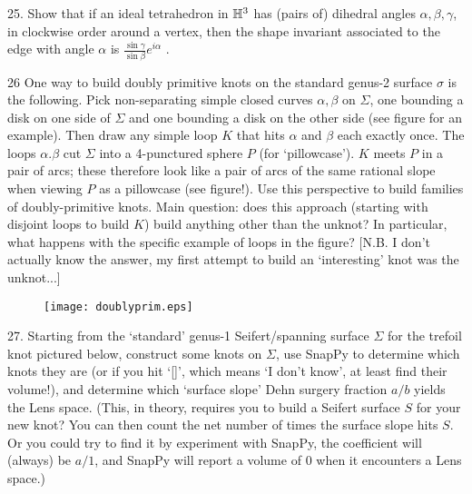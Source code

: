 \documentclass[12pt]{article}
\begin{document}
\begin{description}


\item{25.} Show that if an ideal tetrahedron in ${\mathbb H}^3$ has (pairs of) dihedral angles
$\alpha, \beta, \gamma$, in clockwise order around a vertex, 
then the shape invariant associated to the edge with angle $\alpha$ is 
$\displaystyle\frac{\sin\gamma}{\sin\beta}e^{i\alpha}$ .

\item{26} One way to build doubly primitive knots on the standard genus-2 surface $\sigma$ is the following.
Pick  non-separating simple closed curves $\alpha,\beta$ on $\Sigma$, one bounding a disk on 
one side of $\Sigma$ and
one bounding a disk on the other side (see figure for an example). Then draw any simple loop $K$ that hits $\alpha$ and 
$\beta$ each exactly once. The loops $\alpha.\beta$ cut $\Sigma$ into a 4-punctured sphere $P$ (for `pillowcase'). 
$K$ meets $P$ in a pair of arcs; these therefore  look like a pair of arcs of the same
rational slope when viewing $P$ as a pillowcase (see figure!). Use this perspective to build families of 
doubly-primitive knots. Main question: does this approach (starting with disjoint loops to build $K$)
 build anything other than the unknot? In particular, what happens with the specific example of
loops in the figure? [N.B. I don't actually know the answer, my first attempt to build an `interesting' knot
was the unknot...]

\vspace{-.1in}

\begin{figure}[h]
\begin{center}
\texttt{[image: doublyprim.eps]}
\end{center}
\end{figure} 

\vspace{-.3in}

\item{27.} Starting from the `standard' genus-1 Seifert/spanning surface $\Sigma$ for the trefoil knot pictured below, 
construct some knots on $\Sigma$, use SnapPy to determine which knots they are (or if you hit `[]', which means 
`I don't know', at least find their volume!), and determine which `surface slope' Dehn surgery fraction $a/b$ 
yields the Lens space.
(This, in theory, requires you to build a Seifert surface $S$ for your new knot? You can then count the net number of 
times the surface slope hits $S$. Or you could try to find it
by experiment with SnapPy, the coefficient will (always) be $a/1$, and SnapPy will report a 
volume of $0$ when it encounters a Lens space.)


\end{description}
\end{document}
